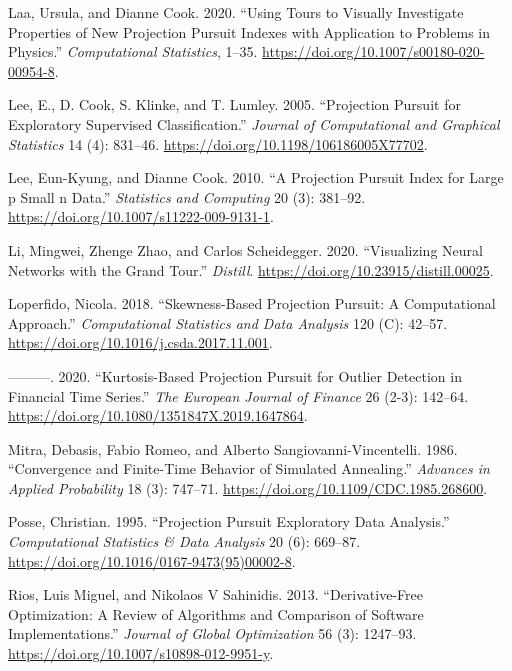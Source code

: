 \begin{CSLReferences}{1}{0}
\leavevmode{}%
Laa, Ursula, and Dianne Cook. 2020. {``Using Tours to Visually Investigate Properties of New Projection Pursuit Indexes with Application to Problems in Physics.''} \emph{Computational Statistics}, 1--35. \url{https://doi.org/10.1007/s00180-020-00954-8}.

\leavevmode{}%
Lee, E., D. Cook, S. Klinke, and T. Lumley. 2005. {``Projection Pursuit for Exploratory Supervised Classification.''} \emph{Journal of Computational and Graphical Statistics} 14 (4): 831--46. \url{https://doi.org/10.1198/106186005X77702}.

\leavevmode{}%
Lee, Eun-Kyung, and Dianne Cook. 2010. {``A Projection Pursuit Index for Large p Small n Data.''} \emph{Statistics and Computing} 20 (3): 381--92. \url{https://doi.org/10.1007/s11222-009-9131-1}.

\leavevmode{}%
Li, Mingwei, Zhenge Zhao, and Carlos Scheidegger. 2020. {``Visualizing Neural Networks with the Grand Tour.''} \emph{Distill}. \url{https://doi.org/10.23915/distill.00025}.

\leavevmode{}%
Loperfido, Nicola. 2018. {``Skewness-Based Projection Pursuit: A Computational Approach.''} \emph{Computational Statistics and Data Analysis} 120 (C): 42--57. \url{https://doi.org/10.1016/j.csda.2017.11.001}.

\leavevmode{}%
---------. 2020. {``Kurtosis-Based Projection Pursuit for Outlier Detection in Financial Time Series.''} \emph{The European Journal of Finance} 26 (2-3): 142--64. \url{https://doi.org/10.1080/1351847X.2019.1647864}.

\leavevmode{}%
Mitra, Debasis, Fabio Romeo, and Alberto Sangiovanni-Vincentelli. 1986. {``Convergence and Finite-Time Behavior of Simulated Annealing.''} \emph{Advances in Applied Probability} 18 (3): 747--71. \url{https://doi.org/10.1109/CDC.1985.268600}.

\leavevmode{}%
Posse, Christian. 1995. {``Projection Pursuit Exploratory Data Analysis.''} \emph{Computational Statistics \& Data Analysis} 20 (6): 669--87. \url{https://doi.org/10.1016/0167-9473(95)00002-8}.

\leavevmode{}%
Rios, Luis Miguel, and Nikolaos V Sahinidis. 2013. {``Derivative-Free Optimization: A Review of Algorithms and Comparison of Software Implementations.''} \emph{Journal of Global Optimization} 56 (3): 1247--93. \url{https://doi.org/10.1007/s10898-012-9951-y}.


\end{CSLReferences}
